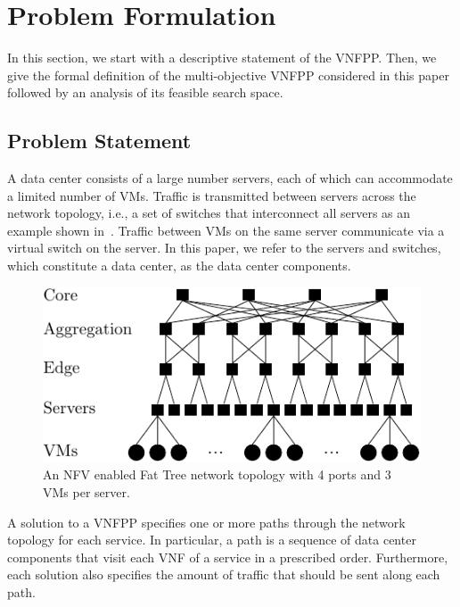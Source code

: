 

\section{Problem Formulation}
\label{sec:problem_formulation}

In this section, we start with a descriptive statement of the VNFPP. Then, we give the formal definition of the multi-objective VNFPP considered in this paper followed by an analysis of its feasible search space.

\subsection{Problem Statement}
\label{sec:statement}

A data center consists of a large number servers, each of which can accommodate a limited number of VMs. Traffic is transmitted between servers across the network topology, i.e., a set of switches that interconnect all servers as an example shown in~. Traffic between VMs on the same server communicate via a virtual switch on the server. In this paper, we refer to the servers and switches, which constitute a data center, as the data center components.

\begin{figure}[t]
	\centering
	\includegraphics{figures/fat_tree-crop}
	\caption{An NFV enabled Fat Tree network topology with 4 ports and 3 VMs per server.}
	\label{fig:topology}
\end{figure}

A solution to a VNFPP specifies one or more paths through the network topology for each service. In particular, a path is a sequence of data center components that visit each VNF of a service in a prescribed order. Furthermore, each solution also specifies the amount of traffic that should be sent along each path.

